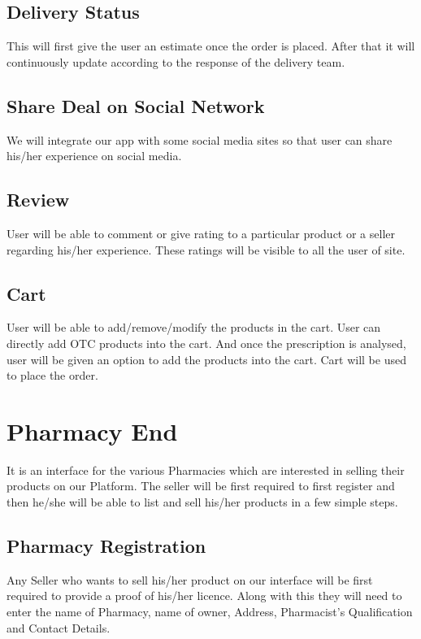 \documentclass[fleqn,10pt]{SelfArx} %
\begin{document}
\subsection{Delivery Status}
This will first give the user an estimate once the order is placed. After that it will continuously update according to the response of the delivery team.

\subsection{Share Deal on Social Network}
We will integrate our app with some social media sites so that user can share his/her experience on social media.
\subsection{Review}
User will be able to comment or give rating to a particular product or a seller regarding his/her experience. These ratings will be visible to all the user of site.
\subsection{Cart}
User will be able to add/remove/modify the products in the cart. User can directly add OTC products into the cart. And once the prescription is analysed, user will be given an option to add the products into the cart. Cart will be used to place the order.

\section{Pharmacy End}

It is an interface for the various Pharmacies which are interested in selling their products on our Platform. The seller will be first required to first register and then he/she will be able to list and sell his/her products in a few simple steps.
\subsection{Pharmacy Registration}

Any Seller who wants to sell his/her product on our interface will be first required to provide a proof of his/her licence. Along with this they will need to enter the name of Pharmacy, name of owner, Address, Pharmacist’s Qualification and Contact Details. 
\end{document}
